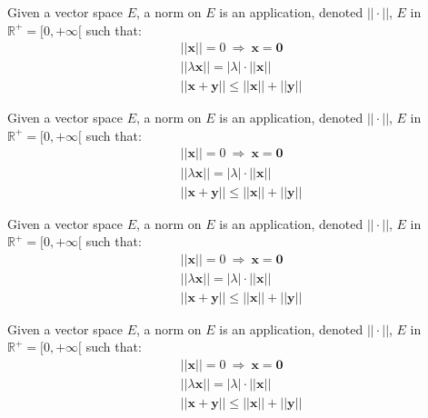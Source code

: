 \begin{example}
Given a vector space $E$, a norm on $E$ is an application, denoted $||\cdot||$, $E$ in $\mathbb{R}^+=[0,+\infty[$ such that:
\begin{align}
& ||\mathbf{x}||=0\ \Rightarrow\ \mathbf{x}=\mathbf{0}\\
& ||\lambda \mathbf{x}||=|\lambda|\cdot ||\mathbf{x}||\\
& ||\mathbf{x}+\mathbf{y}||\leq ||\mathbf{x}||+||\mathbf{y}||
\end{align}
\end{example}

\begin{exercise}
\label{exer:A}
Given a vector space $E$, a norm on $E$ is an application, denoted $||\cdot||$, $E$ in $\mathbb{R}^+=[0,+\infty[$ such that:
\begin{align}
& ||\mathbf{x}||=0\ \Rightarrow\ \mathbf{x}=\mathbf{0}\\
& ||\lambda \mathbf{x}||=|\lambda|\cdot ||\mathbf{x}||\\
& ||\mathbf{x}+\mathbf{y}||\leq ||\mathbf{x}||+||\mathbf{y}||
\end{align}
\end{exercise}


\begin{exercise}
Given a vector space $E$, a norm on $E$ is an application, denoted $||\cdot||$, $E$ in $\mathbb{R}^+=[0,+\infty[$ such that:
\begin{align}
& ||\mathbf{x}||=0\ \Rightarrow\ \mathbf{x}=\mathbf{0}\\
& ||\lambda \mathbf{x}||=|\lambda|\cdot ||\mathbf{x}||\\
& ||\mathbf{x}+\mathbf{y}||\leq ||\mathbf{x}||+||\mathbf{y}||
\end{align}
\end{exercise}

\begin{exercise}
\label{exer:B}
Given a vector space $E$, a norm on $E$ is an application, denoted $||\cdot||$, $E$ in $\mathbb{R}^+=[0,+\infty[$ such that:
\begin{align}
& ||\mathbf{x}||=0\ \Rightarrow\ \mathbf{x}=\mathbf{0}\\
& ||\lambda \mathbf{x}||=|\lambda|\cdot ||\mathbf{x}||\\
& ||\mathbf{x}+\mathbf{y}||\leq ||\mathbf{x}||+||\mathbf{y}||
\end{align}
\end{exercise}

